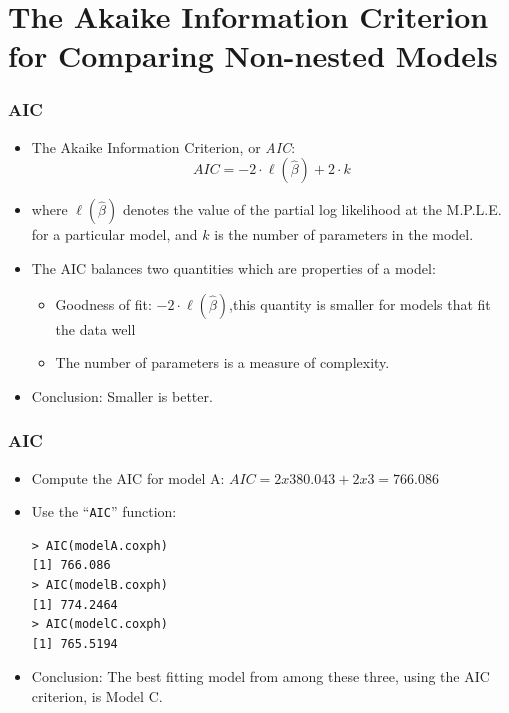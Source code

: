 \documentclass{beamer}
\newcommand{\empr}[1]{{\emph{\color{red}#1}}}
\begin{document}
\section{The Akaike Information Criterion for Comparing Non-nested Models}
\begin{frame}[fragile]
\frametitle{AIC}
\begin{itemize}
\item The Akaike Information Criterion, or \empr{AIC}:
\begin{equation}
AIC = -2\cdot \ell(\hat\beta) + 2\cdot k
\end{equation}
\item where $\ell(\hat\beta)$ denotes the value of the partial log likelihood at the M.P.L.E. for a particular model, and $k$ is the number of parameters in the model.
\item The AIC balances two quantities which are properties of a model:
\begin{itemize}
\item {\color{red}Goodness of fit}: $-2\cdot \ell(\hat\beta)$,this quantity is smaller for models that fit the data well
\item The number of parameters is a measure of complexity.
\end{itemize}
\item Conclusion: Smaller is better.
\end{itemize}
\end{frame}


\pagebreak
\begin{frame}[fragile]
\frametitle{AIC}	
\begin{itemize}
\item Compute the AIC for model A:\linebreak
$AIC = 2 x 380.043 + 2 x 3 = 766.086$
\item Use the ``\texttt{AIC}'' function:
\begin{Verbatim}
> AIC(modelA.coxph)
[1] 766.086
> AIC(modelB.coxph)
[1] 774.2464
> AIC(modelC.coxph)
[1] 765.5194
\end{Verbatim}
\item Conclusion: The best fitting model from among these three, using the AIC criterion, is Model C.
\end{itemize}
\end{frame}
\end{document}
